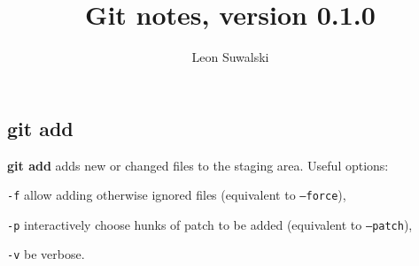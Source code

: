 \documentclass{charun}
\title{Git notes, version 0.1.0}
\author{Leon Suwalski}
\begin{document}
\begin{multicols*}{2}
\maketitle
\raggedright

\section{git add}
\textbf{git add} adds new or changed files to the staging area.
Useful options:
\begin{compactenum}
\item [\texttt{-f}] allow adding otherwise ignored files (equivalent to \texttt{--force}),
\item [\texttt{-p}] interactively choose hunks of patch to be added (equivalent to \texttt{--patch}),
\item [\texttt{-v}] be verbose.
\end{compactenum}
\end{multicols*}
\end{document}
